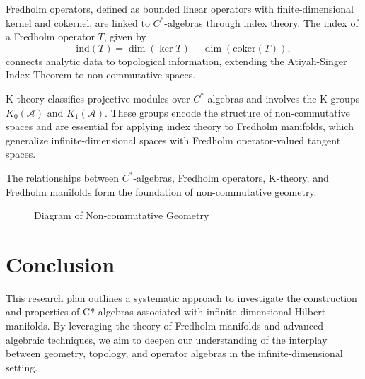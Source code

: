 \documentclass[11pt, twoside, a4paper]{article}
\theoremstyle{mytheoremstyle}
\begin{document}
Fredholm operators, defined as bounded linear operators with finite-dimensional kernel and cokernel, are linked to \( C^* \)-algebras through index theory. The index of a Fredholm operator \( T \), given by
\[
\text{ind}(T) = \dim(\ker T) - \dim(\text{coker}(T)),
\]
connects analytic data to topological information, extending the Atiyah-Singer Index Theorem to non-commutative spaces.

K-theory classifies projective modules over \( C^* \)-algebras and involves the K-groups \( K_0(\mathcal{A}) \) and \( K_1(\mathcal{A}) \). These groups encode the structure of non-commutative spaces and are essential for applying index theory to Fredholm manifolds, which generalize infinite-dimensional spaces with Fredholm operator-valued tangent spaces.

The relationships between \( C^* \)-algebras, Fredholm operators, K-theory, and Fredholm manifolds form the foundation of non-commutative geometry.

\begin{figure}
\centering
{}
\caption{Diagram of Non-commutative Geometry}
\end{figure}

\section{Conclusion}
This research plan outlines a systematic approach to investigate the construction and properties of C*-algebras associated with infinite-dimensional Hilbert manifolds. By leveraging the theory of Fredholm manifolds and advanced algebraic techniques, we aim to deepen our understanding of the interplay between geometry, topology, and operator algebras in the infinite-dimensional setting.
\end{document}
